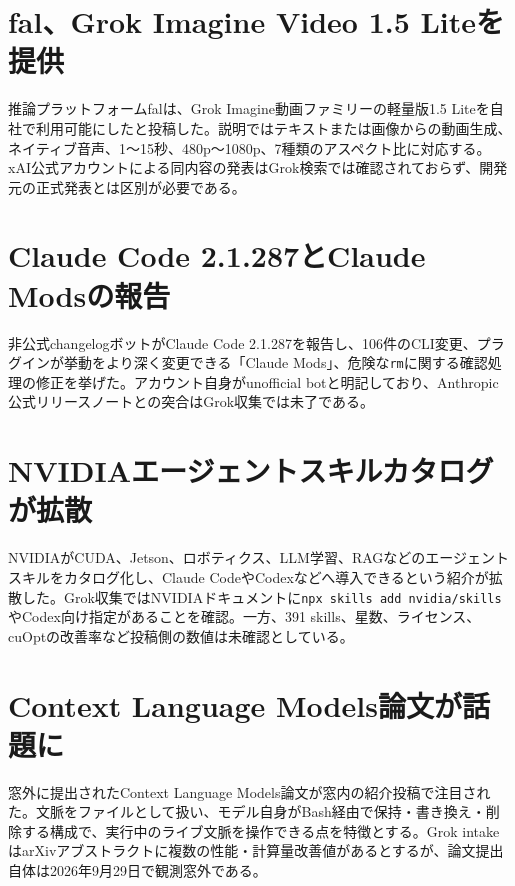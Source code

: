 \section{fal、Grok Imagine Video 1.5 Liteを提供}
推論プラットフォームfalは、Grok Imagine動画ファミリーの軽量版1.5 Liteを自社で利用可能にしたと投稿した。説明ではテキストまたは画像からの動画生成、ネイティブ音声、1〜15秒、480p〜1080p、7種類のアスペクト比に対応する。xAI公式アカウントによる同内容の発表はGrok検索では確認されておらず、開発元の正式発表とは区別が必要である。

\section{Claude Code 2.1.287とClaude Modsの報告}
非公式changelogボットがClaude Code 2.1.287を報告し、106件のCLI変更、プラグインが挙動をより深く変更できる「Claude Mods」、危険な\texttt{rm}に関する確認処理の修正を挙げた。アカウント自身がunofficial botと明記しており、Anthropic公式リリースノートとの突合はGrok収集では未了である。

\section{NVIDIAエージェントスキルカタログが拡散}
NVIDIAがCUDA、Jetson、ロボティクス、LLM学習、RAGなどのエージェントスキルをカタログ化し、Claude CodeやCodexなどへ導入できるという紹介が拡散した。Grok収集ではNVIDIAドキュメントに\texttt{npx skills add nvidia/skills}やCodex向け指定があることを確認。一方、391 skills、星数、ライセンス、cuOptの改善率など投稿側の数値は未確認としている。

\section{Context Language Models論文が話題に}
窓外に提出されたContext Language Models論文が窓内の紹介投稿で注目された。文脈をファイルとして扱い、モデル自身がBash経由で保持・書き換え・削除する構成で、実行中のライブ文脈を操作できる点を特徴とする。Grok intakeはarXivアブストラクトに複数の性能・計算量改善値があるとするが、論文提出自体は2026年9月29日で観測窓外である。

